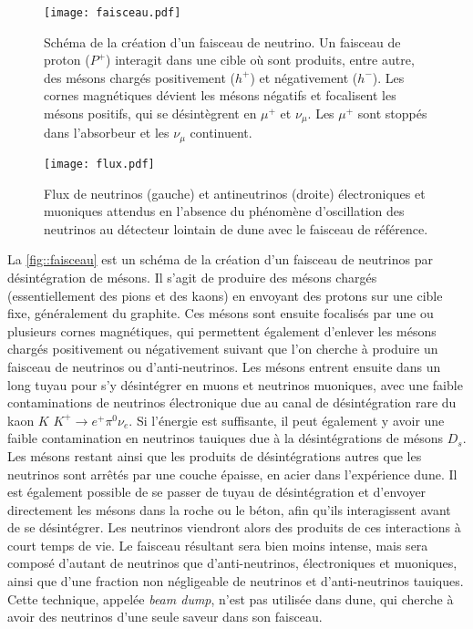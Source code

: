       \begin{figure}[htbp]
        \texttt{[image: faisceau.pdf]}
        \caption[Schéma de la création d'un faisceau de neutrinos]{\label{fig::faisceau}Schéma de la création d'un faisceau de neutrino. Un faisceau de proton ($P^+$) interagit dans une cible où sont produits, entre autre, des mésons chargés positivement ($h^+$) et négativement ($h^-$). Les cornes magnétiques dévient les mésons négatifs et focalisent les mésons positifs, qui se désintègrent en $\mu^+$ et $\nu_{\mu}$. Les $\mu^+$ sont stoppés dans l'absorbeur et les $\nu_{\mu}$ continuent.}
      \end{figure}
      \begin{figure}[htbp]
        \texttt{[image: flux.pdf]}
        \caption[Flux de neutrinos attendus sans oscillations au détecteur lointain de \gls{dune}]{\label{fig::flux}Flux de neutrinos (gauche) et antineutrinos (droite) électroniques et muoniques attendus en l'absence du phénomène d'oscillation des neutrinos au détecteur lointain de \gls{dune} avec le faisceau de référence.}
      \end{figure}
      La \autoref{fig::faisceau} est un schéma de la création d'un faisceau de neutrinos par désintégration de mésons. Il s'agit de produire des mésons chargés (essentiellement des pions et des kaons) en envoyant des protons sur une cible fixe, généralement du graphite. Ces mésons sont ensuite focalisés par une ou plusieurs cornes magnétiques, qui permettent également d'enlever les mésons chargés positivement ou négativement suivant que l'on cherche à produire un faisceau de neutrinos ou d'anti-neutrinos. Les mésons entrent ensuite dans un long tuyau pour s'y désintégrer en muons et neutrinos muoniques, avec une faible contaminations de neutrinos électronique due au canal de désintégration rare du kaon $K$ $K^+ \to e^+ \pi^0 \nu_e$. Si l'énergie est suffisante, il peut également y avoir une faible contamination en neutrinos tauiques due à la désintégrations de mésons $D_s$. Les mésons restant ainsi que les produits de désintégrations autres que les neutrinos sont arrêtés par une couche épaisse, en acier dans l'expérience \gls{dune}. Il est également possible de se passer de tuyau de désintégration et d'envoyer directement les mésons dans la roche ou le béton, afin qu'ils interagissent avant de se désintégrer. Les neutrinos viendront alors des produits de ces interactions à court temps de vie. Le faisceau résultant sera bien moins intense, mais sera composé d'autant de neutrinos que d'anti-neutrinos, électroniques et muoniques, ainsi que d'une fraction non négligeable de neutrinos et d'anti-neutrinos tauiques. Cette technique, appelée \textit{beam dump}, n'est pas utilisée dans \gls{dune}, qui cherche à avoir des neutrinos d'une seule saveur dans son faisceau.
        
